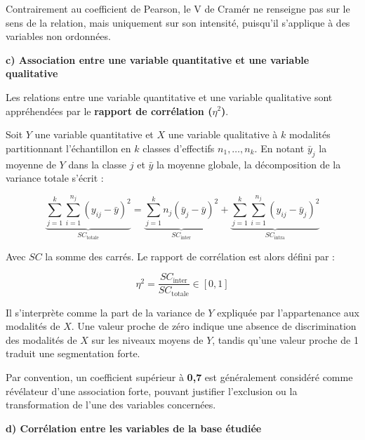Contrairement au coefficient de Pearson, le V de Cramér ne renseigne pas sur le sens de la relation, mais uniquement sur son intensité, puisqu'il s'applique à des variables non ordonnées.

\vspace{2ex}
\noindent\hspace{1.5em}\textbf{c)	Association entre une variable quantitative et une variable qualitative}
\vspace{1ex}

Les relations entre une variable quantitative et une variable qualitative sont appréhendées par le \textbf{rapport de corrélation ($\eta^2$)}.

Soit $Y$ une variable quantitative et $X$ une variable qualitative à $k$ modalités partitionnant l'échantillon en $k$ classes d'effectifs $n_1, \dots, n_k$. En notant $\bar{y}_j$ la moyenne de $Y$ dans la classe $j$ et $\bar{y}$ la moyenne globale, la décomposition de la variance totale s'écrit :

\begin{equation}
    \underbrace{\sum_{j=1}^{k} \sum_{i=1}^{n_j} (y_{ij} - \bar{y})^2}_{SC_{\text{totale}}} = \underbrace{\sum_{j=1}^{k} n_j (\bar{y}_j - \bar{y})^2}_{SC_{\text{inter}}} + \underbrace{\sum_{j=1}^{k} \sum_{i=1}^{n_j} (y_{ij} - \bar{y}_j)^2}_{SC_{\text{intra}}}
\end{equation}

Avec $SC$ la somme des carrés. Le rapport de corrélation est alors défini par :

\begin{equation}
    \eta^2 = \frac{SC_{\text{inter}}}{SC_{\text{totale}}} \in [0, 1]
\end{equation}

Il s'interprète comme la part de la variance de $Y$ expliquée par l'appartenance aux modalités de $X$. Une valeur proche de zéro indique une absence de discrimination des modalités de $X$ sur les niveaux moyens de $Y$, tandis qu'une valeur proche de 1 traduit une segmentation forte.

Par convention, un coefficient supérieur à \textbf{0,7} est généralement considéré comme révélateur d'une association forte, pouvant justifier l'exclusion ou la transformation de l'une des variables concernées.

\vspace{2ex}
\noindent\hspace{1.5em}\textbf{d)	Corrélation entre les variables de la base étudiée}
\vspace{1ex}

